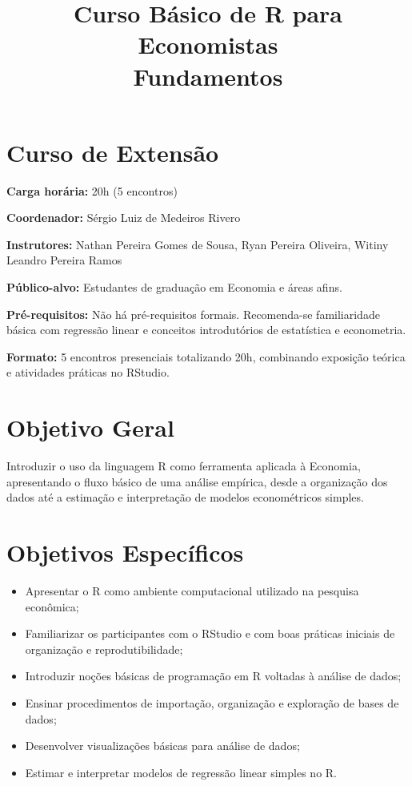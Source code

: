 \documentclass[12pt,a4paper]{article}
\title{\textbf{Curso Básico de R para Economistas}\\
	Fundamentos}
\author{}
\date{}
\begin{document}
	
	\maketitle
	
	\section*{Curso de Extensão}
	
	\noindent \textbf{Carga horária:} 20h (5 encontros)
	
	\noindent \textbf{Coordenador:} Sérgio Luiz de Medeiros Rivero
	
	\noindent \textbf{Instrutores:} Nathan Pereira Gomes de Sousa, Ryan Pereira Oliveira, Witiny Leandro Pereira Ramos
	
	\noindent \textbf{Público-alvo:} Estudantes de graduação em Economia e áreas afins.
	
	\noindent \textbf{Pré-requisitos:} Não há pré-requisitos formais. Recomenda-se familiaridade básica com regressão linear e conceitos introdutórios de estatística e econometria.
	
	\noindent \textbf{Formato:} 5 encontros presenciais totalizando 20h, combinando exposição teórica e atividades práticas no RStudio.
	
	
	\section*{Objetivo Geral}
	
	
	Introduzir o uso da linguagem R como ferramenta aplicada à Economia, apresentando o fluxo básico de uma análise empírica, desde a organização dos dados até a estimação e interpretação de modelos econométricos simples.
	
	\section*{Objetivos Específicos}
	
	\begin{itemize}
		\item Apresentar o R como ambiente computacional utilizado na pesquisa econômica;
		
		\item Familiarizar os participantes com o RStudio e com boas práticas iniciais de organização e reprodutibilidade;
		
		\item Introduzir noções básicas de programação em R voltadas à análise de dados;
		
		\item Ensinar procedimentos de importação, organização e exploração de bases de dados;
		
		\item Desenvolver visualizações básicas para análise de dados;
		
		\item Estimar e interpretar modelos de regressão linear simples no R.
	\end{itemize}
	
\end{document}
